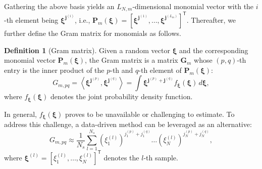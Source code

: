 \documentclass[journal]{IEEEtran}
\theoremstyle{definition}
\newtheorem{definition}{Definition}
\theoremstyle{remark}
\begin{document}
Gathering the above basis yields an $L_{N,m}$-dimensional monomial vector with the $i$-th element being $\boldsymbol{\xi}^{\boldsymbol{j}^{(i)}}$, i.e., $\boldsymbol{P}_m(\boldsymbol{\xi})=[\boldsymbol{\xi}^{\boldsymbol{j}^{(1)}},\dots,\boldsymbol{\xi}^{\boldsymbol{j}^{(L_{m})}}]^{\mathsf{T}}$. Thereafter, we further define the Gram matrix for monomials as follows.
\begin{definition}[Gram matrix]\label{def:1}
Given a random vector $\boldsymbol{\xi}$ and the corresponding monomial vector $\boldsymbol{P}_m(\boldsymbol{\xi})$, the Gram matrix is a matrix $\boldsymbol{G}_{m}$ whose $(p,q)$-th entry is the inner product of the $p$-th and $q$-th element of $\boldsymbol{P}_m(\boldsymbol{\xi})$:
\begin{equation}
    G_{m,pq}=\left\langle \boldsymbol{\xi}^{\boldsymbol{j}^{(p)}}, \boldsymbol{\xi}^{\boldsymbol{j}^{(q)}} \right\rangle=\int \boldsymbol{\xi}^{\boldsymbol{j}^{(p)}+\boldsymbol{j}^{(q)}}f_{\boldsymbol{\xi}}(\boldsymbol{\xi}) \, d\boldsymbol{\xi},
\end{equation}
where $f_{\boldsymbol{\xi}}(\boldsymbol{\xi})$ denotes the joint probability density function.
\end{definition}
In general, $f_{\boldsymbol{\xi}}(\boldsymbol{\xi})$ proves to be unavailable or challenging to estimate. To address this challenge, a data-driven method can be leveraged as an alternative:
\begin{equation}\label{eq:12}
    G_{m,pq}\approx\frac{1}{N_s}\sum\limits_{l=1}^{N_s}(\xi_1^{(l)})^{j_1^{(p)}+j_1^{(q)}}\dots(\xi_N^{(l)})^{j_N^{(p)}+j_N^{(q)}},
\end{equation}
where $\boldsymbol{\xi}^{(l)}=[\xi_1^{(l)},\dots,\xi_N^{(l)}]^{\mathsf{T}}$ denotes the $l$-th sample.
\end{document}
